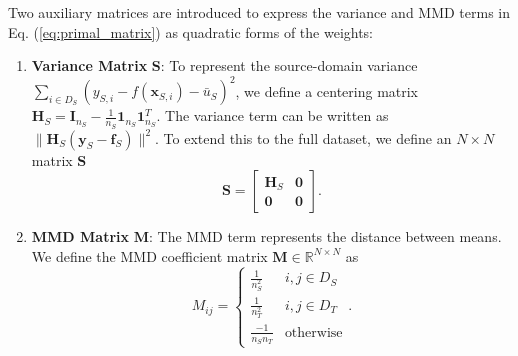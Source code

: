 \documentclass[a4paper]{cas-sc}
\begin{document}
Two auxiliary matrices are introduced to express the variance and MMD terms in Eq. (\ref{eq:primal_matrix}) as quadratic forms of the weights:
\begin{enumerate}
    \item \textbf{Variance Matrix} $\mathbf{S}$: To represent the source-domain variance $\sum_{i \in D_S} (y_{S,i} - f(\boldsymbol{x}_{S,i}) - \bar{u}_S)^2$, we define a centering matrix $\boldsymbol{H}_S = \boldsymbol{I}_{n_S} - \frac{1}{n_S} \boldsymbol{1}_{n_S} \boldsymbol{1}_{n_S}^T$. The variance term can be written as $\| \boldsymbol{H}_S (\boldsymbol{y}_S - \boldsymbol{f}_S) \|^2$. To extend this to the full dataset, we define an $N \times N$ matrix $\mathbf{S}$
    \begin{equation}
    \label{eq:matrix_S}
    \mathbf{S} = \begin{bmatrix} \boldsymbol{H}_S & \mathbf{0} \\ \mathbf{0} & \mathbf{0} \end{bmatrix}.
    \end{equation}
    \item \textbf{MMD Matrix} $\mathbf{M}$: The MMD term represents the distance between means. We define the MMD coefficient matrix $\mathbf{M} \in \mathbb{R}^{N \times N}$ as
    \begin{equation}
    \label{eq:matrix_M}
    M_{ij} = \begin{cases} \frac{1}{n_S^2} & i,j \in D_S \\ \frac{1}{n_T^2} & i,j \in D_T \\ \frac{-1}{n_S n_T} & \text{otherwise} \end{cases}.
    \end{equation}
\end{enumerate}
\end{document}

